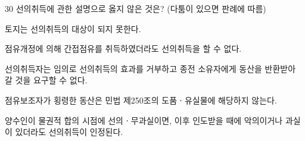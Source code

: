 \begin{question}{30}
선의취득에 관한 설명으로 옳지 않은 것은? (다툼이 있으면 판례에 따름)
\begin{choices}
  \item 토지는 선의취득의 대상이 되지 못한다.
  \item 점유개정에 의해 간접점유를 취득하였더라도 선의취득을 할 수 없다.
  \item 선의취득자는 임의로 선의취득의 효과를 거부하고 종전 소유자에게 동산을 반환받아 갈 것을 요구할 수 없다.
  \item 점유보조자가 횡령한 동산은 민법 제250조의 도품ㆍ유실물에 해당하지 않는다.
  \item 양수인이 물권적 합의 시점에 선의ㆍ무과실이면, 이후 인도받을 때에 악의이거나 과실이 있더라도 선의취득이 인정된다.
\end{choices}
\end{question}
